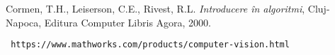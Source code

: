 


\begin{thebibliography}{99}


 Cormen,  T.H.,  Leiserson,  C.E.,  Rivest,  R.L. \textit{Introducere \^ in algoritmi}, Cluj-Napoca, Editura Computer Libris Agora, 2000.

 \begin{verbatim} https://www.mathworks.com/products/computer-vision.html
\end{verbatim}
\end{thebibliography}

